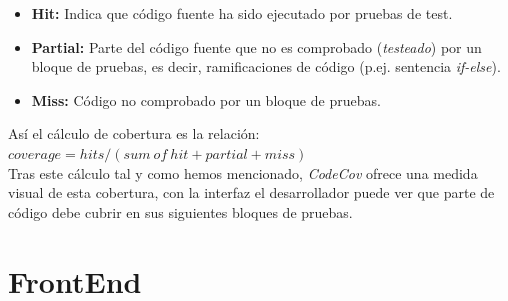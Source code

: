 \documentclass[a4paper, 12pt]{book}
\begin{document}
\begin{itemize}
    \item \textbf{Hit: } Indica que código fuente ha sido ejecutado por pruebas de test.
    \item \textbf{Partial: } Parte del código fuente que no es comprobado (\emph{testeado}) por un bloque de pruebas, es decir, ramificaciones de código (p.ej. sentencia \emph{if-else}).
    \item \textbf{Miss: } Código no comprobado por un bloque de pruebas.
\end{itemize}
Así el cálculo de cobertura es la relación: $coverage = hits / (sum\ of\ hit + partial + miss)$ \\
Tras este cálculo tal y como hemos mencionado, \emph{CodeCov} ofrece una medida visual de esta cobertura, con la interfaz el desarrollador puede ver que parte de código debe cubrir en sus siguientes bloques de pruebas.
        
\section{FrontEnd}
\label{sec:frontEnd}
\end{document}
